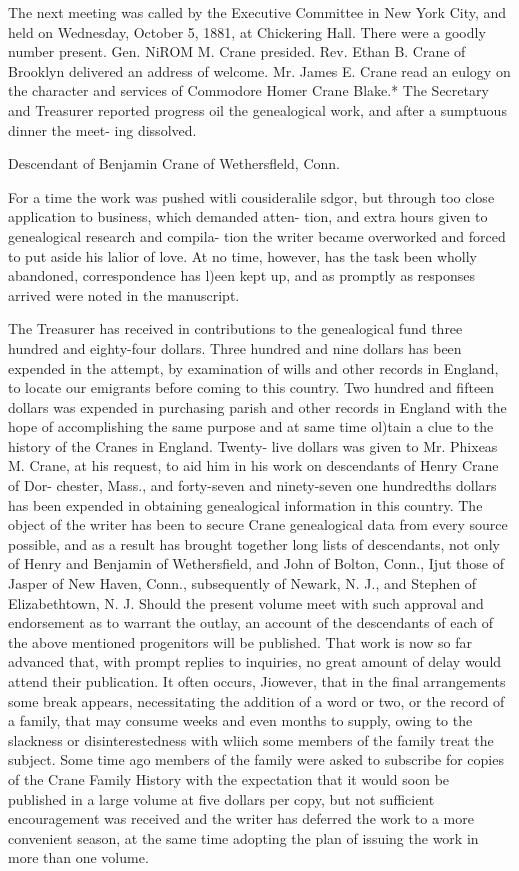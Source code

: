 \documentclass[oneside]{book}
\begin{document}
The next meeting was called by the Executive Committee in 
New York City, and held on Wednesday, October 5, 1881, at 
Chickering Hall. There were a goodly number present. Gen. 
NiROM M. Crane presided. Rev. Ethan B. Crane of Brooklyn 
delivered an address of welcome. Mr. James E. Crane read an 
eulogy on the character and services of Commodore Homer 
Crane Blake.* The Secretary and Treasurer reported progress 
oil the genealogical work, and after a sumptuous dinner the meet- 
ing dissolved. 



Descendant of Benjamin Crane of Wethersfleld, Conn. 



For a time the work was pushed witli cousideralile sdgor, but 
through too close application to business, which demanded atten- 
tion, and extra hours given to genealogical research and compila- 
tion the writer became overworked and forced to put aside his 
lalior of love. At no time, however, has the task been wholly 
abandoned, correspondence has l)een kept up, and as promptly as 
responses arrived were noted in the manuscript. 

The Treasurer has received in contributions to the genealogical 
fund three hundred and eighty-four dollars. Three hundred and 
nine dollars has been expended in the attempt, by examination of 
wills and other records in England, to locate our emigrants before 
coming to this country. Two hundred and fifteen dollars was 
expended in purchasing parish and other records in England with 
the hope of accomplishing the same purpose and at same time 
ol)tain a clue to the history of the Cranes in England. Twenty- 
live dollars was given to Mr. Phixeas M. Crane, at his request, 
to aid him in his work on descendants of Henry Crane of Dor- 
chester, Mass., and forty-seven and ninety-seven one hundredths 
dollars has been expended in obtaining genealogical information 
in this country. The object of the writer has been to secure 
Crane genealogical data from every source possible, and as a 
result has brought together long lists of descendants, not only of 
Henry and Benjamin of Wethersfield, and John of Bolton, 
Conn., Ijut those of Jasper of New Haven, Conn., subsequently 
of Newark, N. J., and Stephen of Elizabethtown, N. J. Should 
the present volume meet with such approval and endorsement as 
to warrant the outlay, an account of the descendants of each of 
the above mentioned progenitors will be published. That work 
is now so far advanced that, with prompt replies to inquiries, no 
great amount of delay would attend their publication. It often 
occurs, Jiowever, that in the final arrangements some break 
appears, necessitating the addition of a word or two, or the 
record of a family, that may consume weeks and even months to 
supply, owing to the slackness or disinterestedness with wliich 
some members of the family treat the subject. Some time ago 
members of the family were asked to subscribe for copies of the 
Crane Family History with the expectation that it would soon 
be published in a large volume at five dollars per copy, but not 
sufficient encouragement was received and the writer has deferred 
the work to a more convenient season, at the same time adopting 
the plan of issuing the work in more than one volume. 
\end{document}
